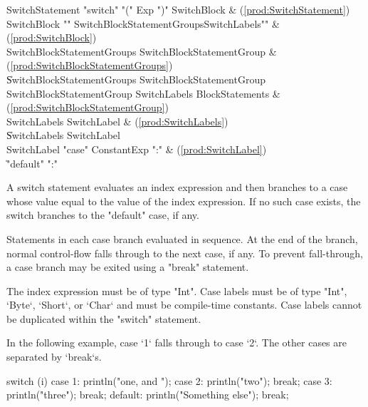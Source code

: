 \begin{bbgrammar}
 SwitchStatement    \: \xcd"switch" \xcd"(" Exp \xcd")" SwitchBlock & (\ref{prod:SwitchStatement})\\%


 SwitchBlock    \: \xcd"{" SwitchBlockStatementGroups\opt SwitchLabels\opt \xcd"}" & (\ref{prod:SwitchBlock})\\%
 SwitchBlockStatementGroups    \: SwitchBlockStatementGroup & (\ref{prod:SwitchBlockStatementGroups})\\%
    \| SwitchBlockStatementGroups SwitchBlockStatementGroup\\
 SwitchBlockStatementGroup    \: SwitchLabels BlockStatements & (\ref{prod:SwitchBlockStatementGroup})\\%
 SwitchLabels    \: SwitchLabel & (\ref{prod:SwitchLabels})\\%
    \| SwitchLabels SwitchLabel\\
 SwitchLabel    \: \xcd"case" ConstantExp \xcd":" & (\ref{prod:SwitchLabel})\\%
    \| \xcd"default" \xcd":"\\

\end{bbgrammar}


A switch statement evaluates an index expression and then branches to
a case whose value equal to the value of the index expression.
If no such case exists, the switch branches to the 
\xcd"default" case, if any.

Statements in each case branch evaluated in sequence.  At the
end of the branch, normal control-flow falls through to the next case, if
any.  To prevent fall-through, a case branch may be exited using
a \xcd"break" statement.

The index expression must be of type \xcd"Int".
Case labels must be of type \xcd"Int", \xcd`Byte`, \xcd`Short`, or \xcd`Char`
and must be compile-time 
constants.  Case labels cannot be duplicated within the
\xcd"switch" statement.

In the following example, case \xcd`1` falls through to case \xcd`2`.  The
other cases are separated by \xcd`break`s.
\begin{xten}
switch (i) {
  case 1: println("one, and ");
  case 2: println("two"); 
          break;
  case 3: println("three");
          break;
  default: println("Something else");
           break;
}
\end{xten}


